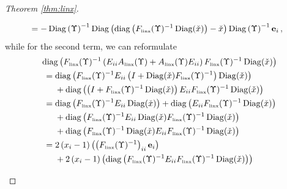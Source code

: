 \documentclass[smallextended]{svjour3hack}       %
\DeclareMathOperator{\Diag}{Diag}
\DeclareMathOperator{\diag}{diag}
\begin{document}
\begin{proof}[Theorem \ref{thm:linx}]
\begin{itemize}
\begin{align*}
     & ~=-  \Diag\left(\Upsilon\right)^{-1} \Diag\left(\diag\left(F_{{\tiny\mbox{linx}}}(\Upsilon)^{-1}\Diag(\check{x})\right)-\check{x}\right) \Diag\left(\Upsilon\right)^{-1} \mathbf{e}_i\,,
 \end{align*}
 while for the second term, we can reformulate
 \begin{align*}
     &\diag\left(F_{{\tiny\mbox{linx}}}(\Upsilon)^{-1}\left(E_{ii}A_{{\tiny\mbox{linx}}}(\Upsilon)+A_{{\tiny\mbox{linx}}}(\Upsilon) E_{ii}\right) F_{{\tiny\mbox{linx}}}(\Upsilon)^{-1}\Diag(\check{x})\right)\\
     &~= \diag\left(F_{{\tiny\mbox{linx}}}(\Upsilon)^{-1}E_{ii}\left(I + \Diag(\check{x}) F_{{\tiny\mbox{linx}}}(\Upsilon)^{-1}\right)\Diag(\check{x})\right) \\
     &~~ \quad + \diag\left(\left(I+ F_{{\tiny\mbox{linx}}}(\Upsilon)^{-1}\Diag(\check{x})\right)E_{ii} F_{{\tiny\mbox{linx}}}(\Upsilon)^{-1}\Diag(\check{x})\right)\\
     &~= \diag\left(F_{{\tiny\mbox{linx}}}(\Upsilon)^{-1}E_{ii}\Diag(\check{x})\right)+ \diag\left( E_{ii}F_{{\tiny\mbox{linx}}}(\Upsilon)^{-1}\Diag(\check{x})\right)\\
     & ~~\quad + \diag\left(F_{{\tiny\mbox{linx}}}(\Upsilon)^{-1}E_{ii} \Diag(\check{x}) F_{{\tiny\mbox{linx}}}(\Upsilon)^{-1}\Diag(\check{x})\right)\\
     &~~\quad + \diag\left( F_{{\tiny\mbox{linx}}}(\Upsilon)^{-1}\Diag(\check{x})E_{ii} F_{{\tiny\mbox{linx}}}(\Upsilon)^{-1}\Diag(\check{x})\right)\\
     &~= 2\left(x_i-1\right)\left( \left(F_{{\tiny\mbox{linx}}}(\Upsilon)^{-1}\right)_{ii} \mathbf{e}_i\right)\\
     &~~\quad + 2\left(x_i-1\right)\left(\diag\left(F_{{\tiny\mbox{linx}}}(\Upsilon)^{-1}E_{ii} F_{{\tiny\mbox{linx}}}(\Upsilon)^{-1}\Diag(\check{x})\right)\right)\\

\end{align*}
\end{itemize}
\end{proof}
\end{document}
